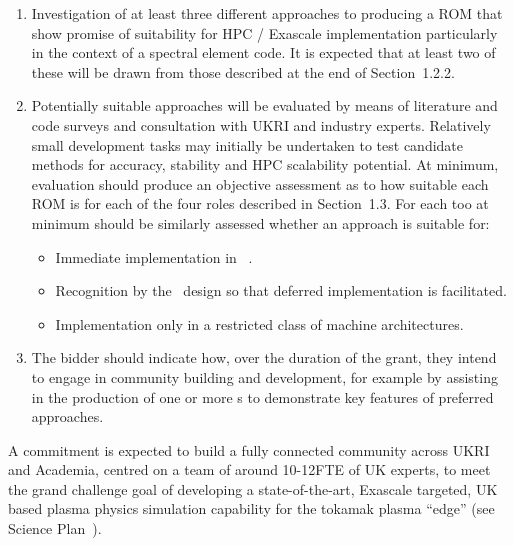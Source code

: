 \begin{enumerate}

\item Investigation of at least three different approaches to producing a
ROM that show promise of suitability for HPC / Exascale implementation particularly
in the context of a spectral element code. It is expected that at least
two of these will be drawn from those described at the end of Section~1.2.2.

\item Potentially suitable approaches will be evaluated by means of 
literature and code surveys and consultation
with UKRI and industry experts.
Relatively small development tasks may initially be undertaken to 
test candidate methods for
accuracy, stability and HPC scalability potential.
At minimum, evaluation should produce an objective assessment as to
how suitable each ROM is for each of the four roles described in 
Section~1.3. For each too at minimum should be similarly assessed
whether an approach is suitable for:
\begin{itemize}
\item Immediate implementation in \nep\ .
\item Recognition by the \nep\ design so that deferred implementation is facilitated.
\item Implementation only in a restricted class of machine architectures.
\end{itemize}

\item The bidder should indicate how, over the duration of the grant, they intend to engage
in community building and development, for example by assisting in the production
of one or more \papp s to demonstrate key features of preferred approaches.

\end{enumerate}

A commitment is expected to build a fully connected community
across UKRI and Academia, centred on 
a team of around 10-12FTE of UK experts, to meet
the grand challenge goal of developing a
state-of-the-art, Exascale targeted, UK based plasma physics simulation 
capability for the tokamak plasma ``edge'' (see Science Plan~\cite{sciplan}).

